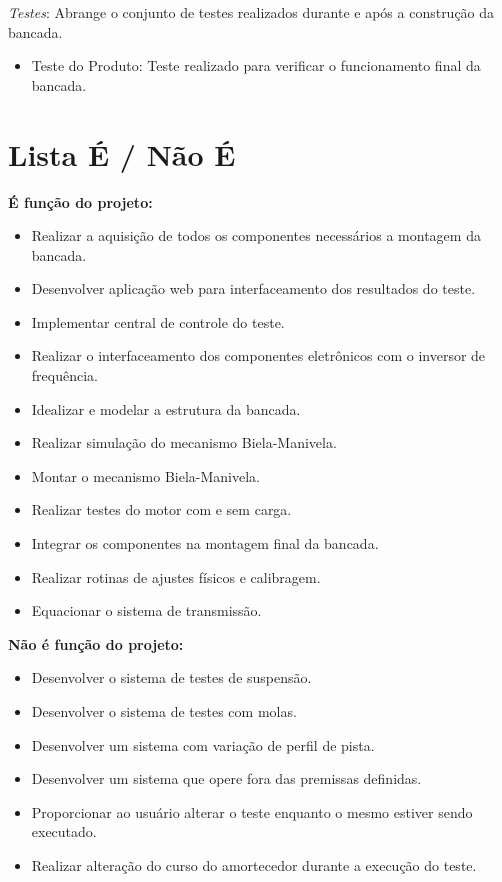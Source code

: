 		\textit{Testes}:
		Abrange o conjunto de testes realizados durante e após a construção da bancada.

		\begin{itemize}
			\item Teste do Produto: Teste realizado para verificar o funcionamento final da bancada.
		\end{itemize}


	\section{Lista É / Não É}
	\label{sec:tap_lista}

		\textbf{ É função do projeto:}

		\begin{itemize}
			\item Realizar a aquisição de todos os componentes necessários a montagem da bancada.
			\item Desenvolver aplicação web para interfaceamento dos resultados do teste.
			\item Implementar central de controle do teste.
			\item Realizar o interfaceamento dos componentes eletrônicos com o inversor de frequência.
			\item Idealizar e modelar a estrutura da bancada.
			\item Realizar simulação do mecanismo Biela-Manivela.
			\item Montar o mecanismo Biela-Manivela.
			\item Realizar testes do motor com e sem carga.
			\item Integrar os componentes na montagem final da bancada.
			\item Realizar rotinas de ajustes físicos e calibragem.
			\item Equacionar o sistema de transmissão.
		\end{itemize}

		\textbf{ Não é função do projeto:}

		\begin{itemize}
			\item Desenvolver o sistema de testes de suspensão.
			\item Desenvolver o sistema de testes com molas.
			\item Desenvolver um sistema com variação de perfil de pista.
			\item Desenvolver um sistema que opere fora das premissas definidas.
			\item Proporcionar ao usuário alterar o teste enquanto o mesmo estiver sendo executado.
			\item Realizar alteração do curso do amortecedor durante a execução do teste.
		\end{itemize}


